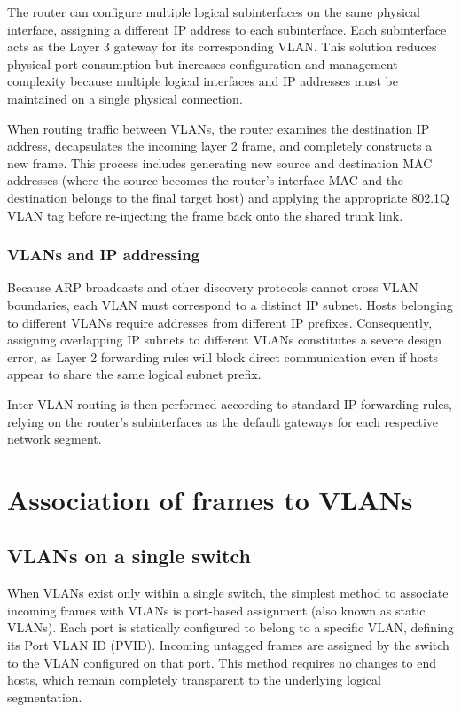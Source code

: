 The router can configure multiple logical subinterfaces on the same physical interface, assigning a different IP address to each subinterface. Each subinterface acts as the Layer 3 gateway for its corresponding VLAN. This solution reduces physical port consumption but increases configuration and management complexity because multiple logical interfaces and IP addresses must be maintained on a single physical connection.

When routing traffic between VLANs, the router examines the destination IP address, decapsulates the incoming layer 2 frame, and completely constructs a new frame. This process includes generating new source and destination MAC addresses (where the source becomes the router's interface MAC and the destination belongs to the final target host) and applying the appropriate 802.1Q VLAN tag before re-injecting the frame back onto the shared trunk link.

\subsubsection{VLANs and IP addressing}
Because ARP broadcasts and other discovery protocols cannot cross VLAN boundaries, each VLAN must correspond to a distinct IP subnet. Hosts belonging to different VLANs require addresses from different IP prefixes. Consequently, assigning overlapping IP subnets to different VLANs constitutes a severe design error, as Layer 2 forwarding rules will block direct communication even if hosts appear to share the same logical subnet prefix. 

\begin{center}
\end{center}

Inter VLAN routing is then performed according to standard IP forwarding rules, relying on the router's subinterfaces as the default gateways for each respective network segment.

\section{Association of frames to VLANs}

\subsection{VLANs on a single switch}
When VLANs exist only within a single switch, the simplest method to associate incoming frames with VLANs is port-based assignment (also known as static VLANs). Each port is statically configured to belong to a specific VLAN, defining its Port VLAN ID (PVID). Incoming untagged frames are assigned by the switch to the VLAN configured on that port. This method requires no changes to end hosts, which remain completely transparent to the underlying logical segmentation.

